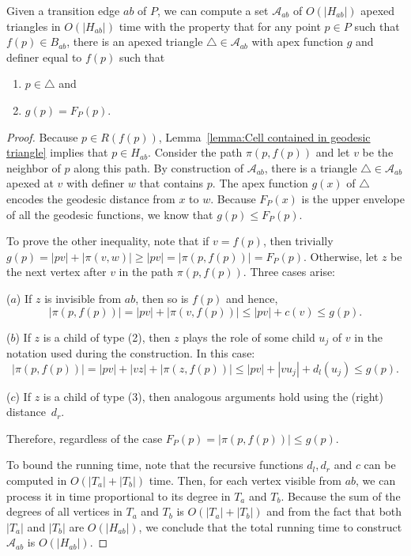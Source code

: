 \documentclass[a4paper,UKenglish]{lipics}
\newcommand{\F}[2]{\ensuremath{F_{\scriptscriptstyle #1}(#2)}}
\newcommand{\ff}[1]{\ensuremath{f(#1)}}
\newcommand{\g}[2]{\ensuremath{|\pi(#1, #2)|}}
\newcommand{\p}[2]{\ensuremath{\pi(#1, #2)}}
\begin{document}
\begin{lemma}\label{lemma:Triangles inside hourglasses}
Given a transition edge $ab$ of $P$, we can compute a set $\mathcal A_{ab}$ of $O(|H_{ab}|)$ apexed triangles in $O(|H_{ab}|)$ time with the property that for any point $p\in P$ such that $\ff{p}\in B_{ab}$,
there is an apexed triangle $\triangle\in \mathcal A_{ab}$ with apex function $g$ and definer equal to $\ff{p}$ such that
\begin{enumerate}
\item $p\in \triangle$ and 
\item $g(p) = \F{P}{p}$.
\end{enumerate}
\end{lemma}
\begin{proof}
Because $p\in R(\ff{p})$, Lemma~\ref{lemma:Cell contained in geodesic triangle} implies that $p\in H_{ab}$. 
Consider the path $\p{p}{\ff{p}}$ and let $v$ be the neighbor of $p$ along this path. 
By construction of $\mathcal A_{ab}$, there is a triangle $\triangle\in \mathcal A_{ab}$ apexed at $v$ with definer $w$ that contains $p$. The apex function $g(x)$ of $\triangle$ encodes the geodesic distance from $x$ to $w$. 
Because $\F{P}{x}$ is the upper envelope of all the geodesic functions, we know that $g(p) \leq \F{P}{p}$.

To prove the other inequality, note that if $v = \ff{p}$, then trivially $g(p) = |pv| + \g{v}{w} \geq |pv| = \g{p}{\ff{p}} = \F{P}{p}$. 
Otherwise, let $z$ be the next vertex after $v$ in the path $\p{p}{\ff{p}}$. Three cases arise:

($a$) If $z$ is invisible from $ab$, then so is $\ff{p}$ and hence, 
$$\g{p}{ \ff{p}} = |pv| + \g{v}{ \ff{p}} \leq |pv| + c(v) \leq g(p).$$

($b$) If $z$ is a child of type (2), then $z$ plays the role of some child $u_j$ of $v$ in the notation used during the construction.
In this case:
$$\g{p}{\ff{p}} = |pv| + |v z| + \g{z}{\ff{p}} \leq |pv| + |v u_j| + d_l(u_j) \leq g(p).$$

($c$) If $z$ is a child of type (3), then analogous arguments hold using the (right) distance~$d_r$.

Therefore, regardless of the case $\F{P}{p} = \g{p}{ \ff{p}} \leq g(p)$.

To bound the running time, note that the recursive functions $d_l, d_r$ and $c$ can be computed in $O(|T_a| + |T_b|)$ time. Then, for each vertex visible from $ab$, we can process it in time proportional to its degree in $T_a$ and $T_b$.
Because the sum of the degrees of all vertices in $T_a$ and $T_b$ is $O(|T_a| + |T_b|)$ and from the fact that both $|T_a|$ and $|T_b|$ are $O(|H_{ab}|)$, we conclude that the total running time to construct $\mathcal A_{ab}$ is $O(|H_{ab}|)$.
\end{proof}
\end{document}

